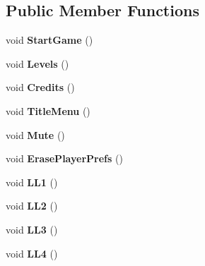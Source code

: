 \subsection*{Public Member Functions}
\begin{DoxyCompactItemize}
\item 
\hypertarget{class_u_i_manager_a7624d3a683a3bfdd3a49ae3ceb395062}{}void {\bfseries Start\+Game} ()\label{class_u_i_manager_a7624d3a683a3bfdd3a49ae3ceb395062}

\item 
\hypertarget{class_u_i_manager_a7334437549298fccba630fae163ae011}{}void {\bfseries Levels} ()\label{class_u_i_manager_a7334437549298fccba630fae163ae011}

\item 
\hypertarget{class_u_i_manager_ae3cc632f0f4b5d8ac834b916f4a7a227}{}void {\bfseries Credits} ()\label{class_u_i_manager_ae3cc632f0f4b5d8ac834b916f4a7a227}

\item 
\hypertarget{class_u_i_manager_a7f294a62a5ffa29703c4b63d2a13a9e0}{}void {\bfseries Title\+Menu} ()\label{class_u_i_manager_a7f294a62a5ffa29703c4b63d2a13a9e0}

\item 
\hypertarget{class_u_i_manager_ae3a4150cd8a6084b3083a2e401b41ab6}{}void {\bfseries Mute} ()\label{class_u_i_manager_ae3a4150cd8a6084b3083a2e401b41ab6}

\item 
\hypertarget{class_u_i_manager_ae21771d6c1fe4d3eee2b560739ef4390}{}void {\bfseries Erase\+Player\+Prefs} ()\label{class_u_i_manager_ae21771d6c1fe4d3eee2b560739ef4390}

\item 
\hypertarget{class_u_i_manager_ae6bc9f303bf210ce7dc6f4c596bdca99}{}void {\bfseries L\+L1} ()\label{class_u_i_manager_ae6bc9f303bf210ce7dc6f4c596bdca99}

\item 
\hypertarget{class_u_i_manager_aaca89d82ac2df5fb4f72ed4c038dab06}{}void {\bfseries L\+L2} ()\label{class_u_i_manager_aaca89d82ac2df5fb4f72ed4c038dab06}

\item 
\hypertarget{class_u_i_manager_a6e12a820266a4ff8502f47c78b268c0d}{}void {\bfseries L\+L3} ()\label{class_u_i_manager_a6e12a820266a4ff8502f47c78b268c0d}

\item 
\hypertarget{class_u_i_manager_ae3fb7a43113d2e56ab37fd29fa4d18cb}{}void {\bfseries L\+L4} ()\label{class_u_i_manager_ae3fb7a43113d2e56ab37fd29fa4d18cb}


\end{DoxyCompactItemize}
